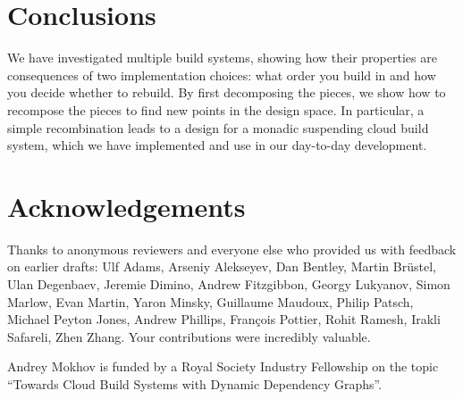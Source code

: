 \section{Conclusions}\label{sec-conclusions}

We have investigated multiple build systems, showing how their properties are
consequences of two implementation choices: what order you build in and how you
decide whether to rebuild. By first decomposing the pieces, we show how to
recompose the pieces to find new points in the design space. In particular, a
simple recombination leads to a design for a monadic suspending cloud build
system, which we have implemented and use in our day-to-day development.

\section*{Acknowledgements}

Thanks to anonymous reviewers and everyone else who provided us with feedback
on earlier drafts: Ulf Adams, Arseniy Alekseyev, Dan Bentley, Martin
Br\"{u}stel, Ulan Degenbaev, Jeremie Dimino, Andrew Fitzgibbon, Georgy
Lukyanov, Simon Marlow, Evan Martin, Yaron Minsky, Guillaume Maudoux, Philip
Patsch, Michael Peyton Jones, Andrew Phillips, Fran\c{c}ois Pottier, Rohit
Ramesh, Irakli Safareli, Zhen Zhang. Your contributions were incredibly
valuable.

Andrey Mokhov is funded by a Royal Society Industry Fellowship 
on the topic ``Towards Cloud Build Systems with Dynamic Dependency Graphs''.
